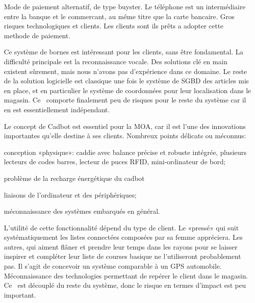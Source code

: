 \startnote
{} Mode de paiement alternatif, de type buyster. Le téléphone est un intermédiaire entre la banque et le commercant, au même titre que la carte bancaire. 
 Gros risques technologiques et clients. Les clients sont ils prêts a adopter cette methode de paiement.
\stopnote

\startnote
{} Ce système de bornes est intéressant pour les clients, sans être fondamental.
 La difficulté principale est la reconnaissance vocale. 
Des solutions clé en main existent sûrement, mais nous n'avons pas d'expérience dans ce domaine.
Le reste de la solution logicielle est classique une fois le système de SGBD des articles mis en place, et en particulier le système de coordonnées pour leur localisation dans le magasin.
Ce \cu\ comporte finalement peu de risques pour le reste du système car il en est essentiellement indépendant.
\stopnote

\startnote
{} Le concept de Cadbot est essentiel pour la MOA, car il est l'une des innovations importantes qu'elle destine à ses clients.
 Nombreux points délicats ou méconnus:
\startitemize
\item conception «physique»: caddie avec balance précise et robuste intégrée, plusieurs lecteurs de codes barres, lecteur de puces RFID, mini-ordinateur de bord;
\item problème de la recharge énergétique du cadbot
\item liaisons de l'ordinateur et des périphériques;
\item méconnaissance des systèmes embarqués en général.
\stopitemize
\stopnote

\startnote
{} L'utilité de cette fonctionnalité dépend du type de client.
Le «pressé» qui suit systématiquement les listes connectées composées par sa femme appréciera.
Les autres, qui aiment flâner et prendre leur temps dans les rayons pour se laisser inspirer et compléter leur liste de courses basique ne l'utiliseront probablement pas.
 Il s'agit de concevoir un système comparable à un GPS automobile.
Méconnaissance des technologies permettant de repérer le client dans le magasin.
Ce \cu\ est découplé du reste du système, donc le risque en termes d'impact est peu important.
\stopnote

